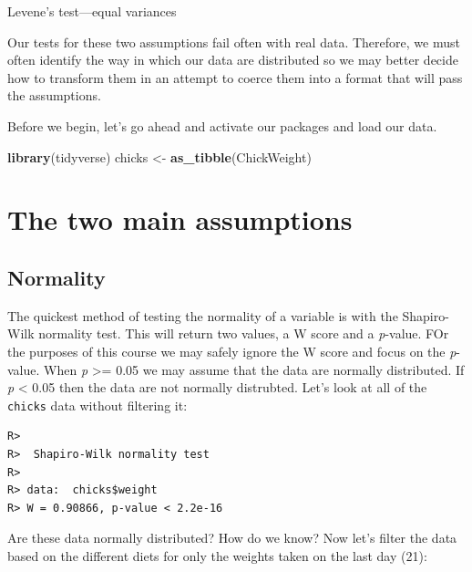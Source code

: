 \documentclass[english,10pt,a4paper,oneside]{book}
\newenvironment{Shaded}{\begin{snugshade}}{\end{snugshade}}
\newcommand{\KeywordTok}[1]{\textcolor[rgb]{0.13,0.29,0.53}{\textbf{#1}}}
\newcommand{\StringTok}[1]{\textcolor[rgb]{0.31,0.60,0.02}{#1}}
\newcommand{\OperatorTok}[1]{\textcolor[rgb]{0.81,0.36,0.00}{\textbf{#1}}}
\newcommand{\NormalTok}[1]{#1}
\theoremstyle{definition}
\theoremstyle{definition}
\theoremstyle{definition}
\theoremstyle{remark}
\begin{document}
Levene's test---equal variances

Our tests for these two assumptions fail often with real data.
Therefore, we must often identify the way in which our data are
distributed so we may better decide how to transform them in an attempt
to coerce them into a format that will pass the assumptions.

Before we begin, let's go ahead and activate our packages and load our
data.

\begin{Shaded}
\begin{Highlighting}[]
\KeywordTok{library}\NormalTok{(tidyverse)}
\NormalTok{chicks <-}\StringTok{ }\KeywordTok{as_tibble}\NormalTok{(ChickWeight)}
\end{Highlighting}
\end{Shaded}

\section{The two main assumptions}\label{the-two-main-assumptions}

\subsection{Normality}\label{normality-1}

The quickest method of testing the normality of a variable is with the
Shapiro-Wilk normality test. This will return two values, a W score and
a \emph{p}-value. FOr the purposes of this course we may safely ignore
the W score and focus on the \emph{p}-value. When \emph{p}
\textgreater{}= 0.05 we may assume that the data are normally
distributed. If \emph{p} \textless{} 0.05 then the data are not normally
distrubted. Let's look at all of the \texttt{chicks} data without
filtering it:

\begin{Shaded}
\end{Shaded}

\begin{verbatim}
R> 
R>  Shapiro-Wilk normality test
R> 
R> data:  chicks$weight
R> W = 0.90866, p-value < 2.2e-16
\end{verbatim}

Are these data normally distributed? How do we know? Now let's filter
the data based on the different diets for only the weights taken on the
last day (21):
\end{document}
